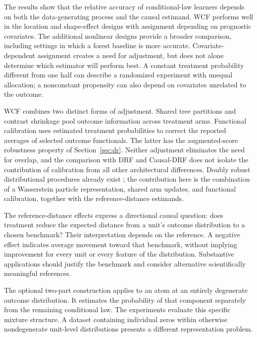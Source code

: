 \documentclass[11pt]{article}
\begin{document}
The results show that the relative accuracy of conditional-law learners depends on both the data-generating process and the causal estimand. WCF performs well in the location and shape-effect designs with assignment depending on prognostic covariates. The additional nonlinear designs provide a broader comparison, including settings in which a forest baseline is more accurate. Covariate-dependent assignment creates a need for adjustment, but does not alone determine which estimator will perform best. A constant treatment probability different from one half can describe a randomized experiment with unequal allocation; a nonconstant propensity can also depend on covariates unrelated to the outcome.

WCF combines two distinct forms of adjustment. Shared tree partitions and contrast shrinkage pool outcome information across treatment arms. Functional calibration uses estimated treatment probabilities to correct the reported averages of selected outcome functionals. The latter has the augmented-score robustness property of Section~\ref{sec:dr}. Neither adjustment eliminates the need for overlap, and the comparison with DRF and Causal-DRF does not isolate the contribution of calibration from all other architectural differences. Doubly robust distributional procedures already exist \citep{martineztaboada2023efficient,GRFDistributionalCausalEffects}; the contribution here is the combination of a Wasserstein particle representation, shared arm updates, and functional calibration, together with the reference-distance estimands.

The reference-distance effects express a directional causal question: does treatment reduce the expected distance from a unit's outcome distribution to a chosen benchmark? Their interpretation depends on the reference. A negative effect indicates average movement toward that benchmark, without implying improvement for every unit or every feature of the distribution. Substantive applications should justify the benchmark and consider alternative scientifically meaningful references.

The optional two-part construction applies to an atom at an entirely degenerate outcome distribution. It estimates the probability of that component separately from the remaining conditional law. The experiments evaluate this specific mixture structure. A dataset containing individual zeros within otherwise nondegenerate unit-level distributions presents a different representation problem.
\end{document}
